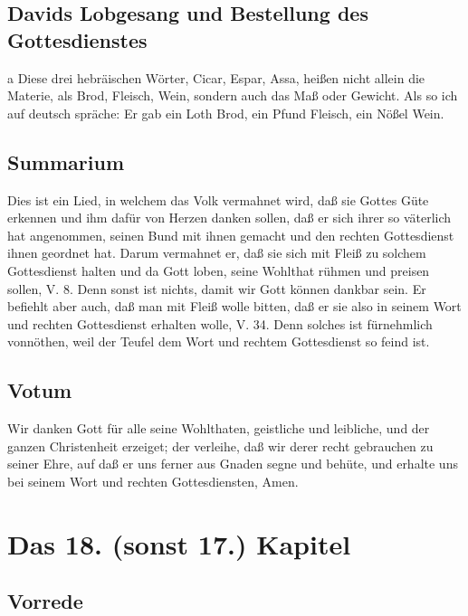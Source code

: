 \section[Davids Lobgesang und Bestellung des Gottesdienstes]{Davids Lobgesang und Bestellung des Gottesdienstes}

a Diese drei hebräischen Wörter, Cicar, Espar, Assa, heißen nicht allein die Materie, als Brod, Fleisch, Wein, sondern auch das Maß oder Gewicht. Als so ich auf deutsch spräche: Er gab ein Loth Brod, ein Pfund Fleisch, ein Nößel Wein.

\section{Summarium}

Dies ist ein Lied, in welchem das Volk vermahnet wird, daß sie Gottes Güte erkennen und ihm dafür von Herzen danken sollen, daß er sich ihrer so väterlich hat angenommen, seinen Bund mit ihnen gemacht und den rechten Gottesdienst ihnen geordnet hat. Darum vermahnet er, daß sie sich mit Fleiß zu solchem Gottesdienst halten und da Gott loben, seine Wohlthat rühmen und preisen sollen, V. 8. Denn sonst ist nichts, damit wir Gott können dankbar sein. Er befiehlt aber auch, daß man mit Fleiß wolle bitten, daß er sie also in seinem Wort und rechten Gottesdienst erhalten wolle, V. 34. Denn solches ist fürnehmlich vonnöthen, weil der Teufel dem Wort und rechtem Gottesdienst so feind ist.

\section{Votum}

Wir danken Gott für alle seine Wohlthaten, geistliche und leibliche, und der ganzen Christenheit erzeiget; der verleihe, daß wir derer recht gebrauchen zu seiner Ehre, auf daß er uns ferner aus Gnaden segne und behüte, und erhalte uns bei seinem Wort und rechten Gottesdiensten, Amen.

\chapter{Das 18. (sonst 17.) Kapitel}

\section{Vorrede}

